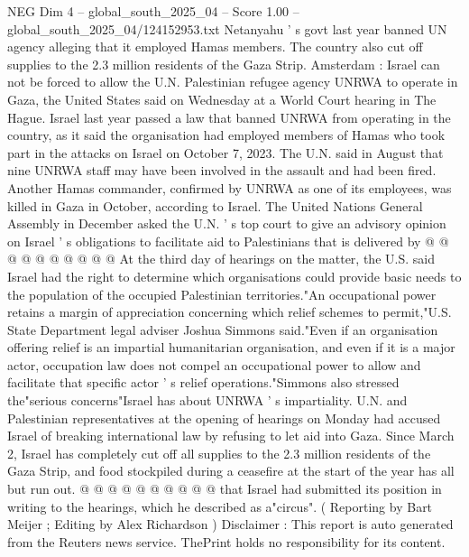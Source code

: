\begin{textsample}{NEG Dim 4 – global\_south\_2025\_04 – Score 1.00 – global\_south\_2025\_04/124152953.txt}  \label{ex:f4_neg_214}
Netanyahu ' s govt last year banned UN agency alleging that it employed Hamas members.
The country also cut off supplies to the 2.3 million residents of the Gaza Strip.
Amsterdam : Israel can not be forced to allow the U.N.
Palestinian refugee agency UNRWA to operate in Gaza, the United States said on Wednesday at a World Court hearing in The Hague.
Israel last year passed a law that banned UNRWA from operating in the country, as it said the organisation had employed members of Hamas who took part in the attacks on Israel on October 7, 2023.
The U.N. said in August that nine UNRWA staff may have been involved in the assault and had been fired.
Another Hamas commander, confirmed by UNRWA as one of its employees, was killed in Gaza in October, according to Israel.
The United Nations General Assembly in December asked the U.N. ' s top court to give an advisory opinion on Israel ' s obligations to facilitate aid to Palestinians that is delivered by @ @ @ @ @ @ @ @ @ @ At the third day of hearings on the matter, the U.S. said Israel had the right to determine which organisations could provide basic needs to the population of the occupied Palestinian territories."An occupational power retains a margin of appreciation concerning which relief schemes to permit,"U.S.
State Department legal adviser Joshua Simmons said."Even if an organisation offering relief is an impartial humanitarian organisation, and even if it is a major actor, occupation law does not compel an occupational power to allow and facilitate that specific actor ' s relief operations."Simmons also stressed the"serious concerns"Israel has about UNRWA ' s impartiality.
U.N. and Palestinian representatives at the opening of hearings on Monday had accused Israel of breaking international law by refusing to let aid into Gaza.
Since March 2, Israel has completely cut off all supplies to the 2.3 million residents of the Gaza Strip, and food stockpiled during a ceasefire at the start of the year has all but run out. @ @ @ @ @ @ @ @ @ @ that Israel had submitted its position in writing to the hearings, which he described as a"circus". ( Reporting by Bart Meijer ; Editing by Alex Richardson ) Disclaimer : This report is auto generated from the Reuters news service.
ThePrint holds no responsibility for its content.

\end{textsample}

